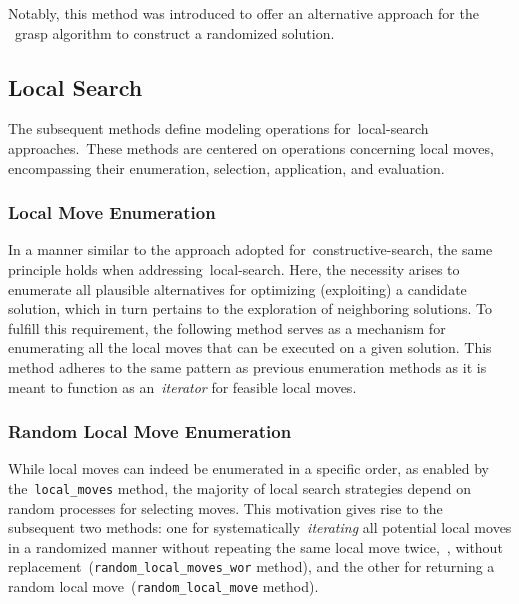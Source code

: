 Notably, this method was introduced to offer an alternative approach for the
~\acrshort{grasp} algorithm to construct a randomized solution.

\subsection{Local Search}

The subsequent methods define modeling operations for~\acrshort{local-search}
approaches.~These methods are centered on operations concerning local moves,
encompassing their enumeration, selection, application, and evaluation.

\subsubsection*{Local Move Enumeration}

In a manner similar to the approach adopted for~\acrshort{constructive-search},
the same principle holds when addressing~\acrshort{local-search}. Here, the
necessity arises to enumerate all plausible alternatives for optimizing
(exploiting) a candidate solution, which in turn pertains to the exploration of
neighboring solutions. To fulfill this requirement, the following method serves
as a mechanism for enumerating all the local moves that can be executed on a
given solution. This method adheres to the same pattern as previous enumeration
methods as it is meant to function as an~\emph{iterator} for feasible local
moves.

\begin{center}
\end{center}

\subsubsection*{Random Local Move Enumeration}

While local moves can indeed be enumerated in a specific order, as enabled by
the~\texttt{local\_moves} method, the majority of local search strategies depend on random
processes for selecting moves. This motivation gives rise to the subsequent two
methods: one for systematically~\emph{iterating} all potential local moves in a
randomized manner without repeating the same local move twice,~\ie{}, without
replacement~(\texttt{random\_local\_moves\_wor} method), and the other for returning a random local
move~(\texttt{random\_local\_move} method).

